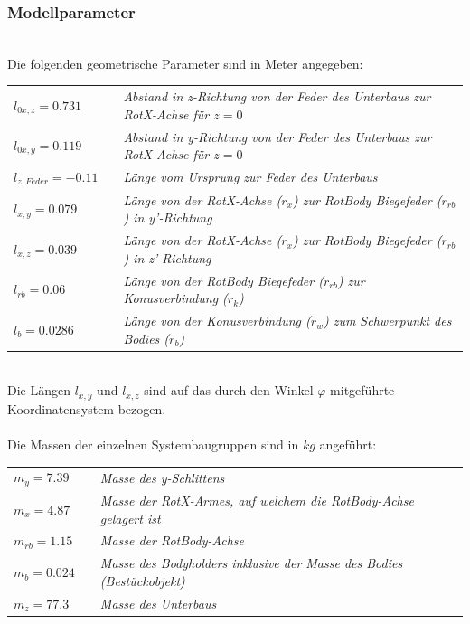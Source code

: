 \documentclass[10pt,a4paper]{iace.report}
\begin{document}
				 \subsubsection{Modellparameter}\label{sec:modellparameter}\leavevmode\\
					Die folgenden geometrische Parameter sind in  Meter angegeben:\\
					\vspace{10pt} \def\arraystretch{1.2}
					\begin{tabular}{lp{1cm}p{8.6cm}}
						$ l_{0x,z}=0.731 $ && \textit{Abstand in z-Richtung von der Feder des Unterbaus zur RotX-Achse für $ z=0 $}\\
						$ l_{0x,y}=0.119 $ &&\textit{Abstand in y-Richtung von der Feder des Unterbaus zur RotX-Achse für $ z=0$ } \\ 
						$ l_{z,Feder}=-0.11 $ &&\textit{Länge vom Ursprung zur Feder des Unterbaus} \\
						$ l_{x,y}=0.079 $ && \textit{Länge von der RotX-Achse ($ r_{x} $) zur RotBody Biegefeder ($ r_{rb} $) in y'-Richtung}\\
						$ l_{x,z}=0.039 $ && \textit{Länge von der RotX-Achse ($ r_{x} $) zur RotBody Biegefeder ($ r_{rb} $) in z'-Richtung}\\
						$ l_{rb}=0.06 $ &&\textit{Länge von der RotBody Biegefeder ($ r_{rb} $) zur Konusverbindung ($ r_{k} $)} \\
						$ l_{b}=0.0286 $ &&\textit{Länge von der Konusverbindung ($ r_{w} $) zum Schwerpunkt des Bodies ($ r_{b} $)}\\
					\end{tabular}\leavevmode\\
					Die Längen $ l_{x,y} $ und $ l_{x,z} $ sind auf das durch den Winkel $ \varphi $ mitgeführte Koordinatensystem bezogen.\\\\
					Die Massen der einzelnen Systembaugruppen sind in $ kg $ angeführt:\\\vspace{10pt} \def\arraystretch{1.2}
					\begin{tabular}{lp{1cm}p{8.6cm}}
						$ m_{y}=7.39 $ && \textit{Masse des y-Schlittens}\\ 
						$ m_{x}=4.87 $ && \textit{Masse der RotX-Armes, auf welchem die RotBody-Achse gelagert ist}\\ 
						$ m_{rb}=1.15 $ && \textit{Masse der RotBody-Achse}\\ 
						$ m_{b}=0.024 $ && \textit{Masse des Bodyholders inklusive der Masse des Bodies (Bestückobjekt)}\\ 
						$ m_{z} = 77.3 $ && \textit{Masse des Unterbaus}\\
					\end{tabular}\leavevmode\\
\end{document}
